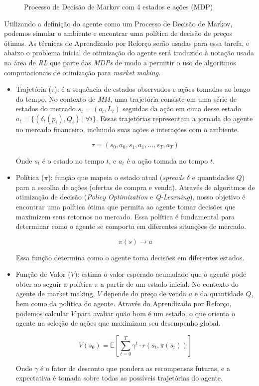 \begin{figure}[H]
	\centering
	
	\caption{Processo de Decisão de Markov com 4 estados e ações (MDP)}
	\label{fig:mdp}
\end{figure}

Utilizando a definição do agente como um Processo de Decisão de Markov, podemos simular o ambiente e encontrar uma política de decisão de preços ótimas. As técnicas de Aprendizado por Reforço serão usadas para essa tarefa, e abaixo o problema inicial de otimização do agente será traduzido à notação usada na área de \textit{RL} que parte das \textit{MDPs} de modo a permitir o uso de algoritmos computacionais de otimização para \textit{market making}.


\begin{itemize}
	\item Trajetória ($\tau$): é a sequência de estados observados e ações tomadas ao longo do tempo. No contexto de \textit{MM}, uma trajetória consiste em uma série de estados do mercado $s_{t} = (o_{t}, L_{t})$ seguidas da ação em cima desse estado $a_{t} = \{(\delta_{t}(p_{i}), Q_{i}) \ | \ \forall i \}$. Essas trajetórias representam a jornada do agente no mercado financeiro, incluindo suas ações e interações com o ambiente.
	
	\[
	\tau = (s_0, a_0, s_1, a_1, \ldots, s_T, a_T)
	\]
	
	Onde \(s_t\) é o estado no tempo \(t\), e \(a_t\) é a ação tomada no tempo \(t\).
	
	\item Política ($\pi$): função que mapeia o estado atual (\textit{spreads} $\delta$ e quantidades $Q$) para a escolha de ações (ofertas de compra e venda). Através de algoritmos de otimização de decisão (\textit{Policy Optimization} e \textit{Q-Learning}), nosso objetivo é encontrar uma política ótima que permita ao agente tomar decisões que maximizem seus retornos no mercado. Essa política é fundamental para determinar como o agente se comporta em diferentes situações de mercado.
	
	\[
	\pi(s) \rightarrow a
	\]
	
	Essa função determina como o agente toma decisões em diferentes estados.
	
	\item Função de Valor ($V$): estima o valor esperado acumulado que o agente pode obter ao seguir a política \(\pi\) a partir de um estado inicial. No contexto do agente de market making, \(V\) depende do preço de venda \(a\) e da quantidade \(Q\), bem como da política do agente. Através do Aprendizado por Reforço, podemos calcular \(V\) para avaliar quão bom é um estado, o que orienta o agente na seleção de ações que maximizam seu desempenho global.
	
	\begin{equation*}
		V(s_0) = \mathbb{E}\left[\sum_{t=0}^{T} \gamma^t \cdot r(s_t, \pi(s_t)) \right]
		\end{equation*}
		
	Onde \(\gamma\) é o fator de desconto que pondera as recompensas futuras, e a expectativa é tomada sobre todas as possíveis trajetórias do agente.
\end{itemize}

